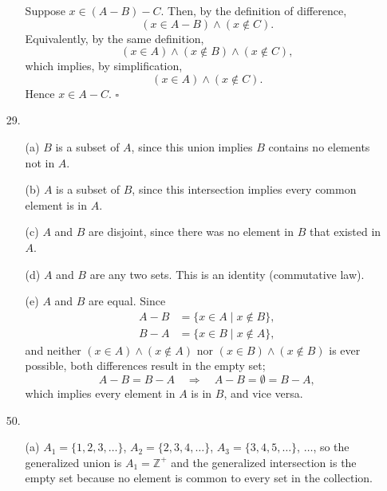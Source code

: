 \documentclass{article}
\begin{document}
\begin{enumerate}
\begin{itemize}
            Suppose $x \in (A-B)-C$. Then, by the definition of difference,
            \[
            (x \in A-B) \land (x \notin C).
            \]
            Equivalently, by the same definition,
            \[
            (x \in A) \land (x \notin B) \land (x \notin C),
            \]
            which implies, by simplification,
            \[
            (x \in A) \land (x \notin C).
            \]
            Hence $x \in A-C$. $\square$
        \end{itemize}
    \item[29.]
        \begin{itemize}
            \item[(a)] $B$ is a subset of $A$, since this union implies $B$ contains no elements not in $A$.
            \item[(b)] $A$ is a subset of $B$, since this intersection implies every common element is in $A$.
            \item[(c)] $A$ and $B$ are disjoint, since there was no element in $B$ that existed in $A$.
            \item[(d)] $A$ and $B$ are any two sets. This is an identity (commutative law).
            \item[(e)] $A$ and $B$ are equal. Since
            \begin{align*}
            A - B &= \{ x \in A \mid x \notin B \}, \\
            B - A &= \{ x \in B \mid x \notin A \},
            \end{align*}
            and neither $(x \in A) \land (x \notin A)$ nor $(x \in B) \land (x \notin B)$ is ever possible, both differences result in the empty set;
            \[
            A - B = B - A \quad\Longrightarrow\quad A - B = \emptyset = B - A,
            \]
            which implies every element in $A$ is in $B$, and vice versa.
        \end{itemize}
    \item[50.]
        \begin{itemize}
            \item[(a)] $A_1 = \{ 1, 2, 3, \ldots \}$, $A_2 = \{ 2, 3, 4, \ldots \}$, $A_3 = \{ 3, 4, 5, \ldots \}$, $\ldots$, so the generalized union is $A_1 = \mathbb{Z}^+$ and the generalized intersection is the empty set because no element is common to every set in the collection. \\ %

\end{itemize}
\end{enumerate}
\end{document}
